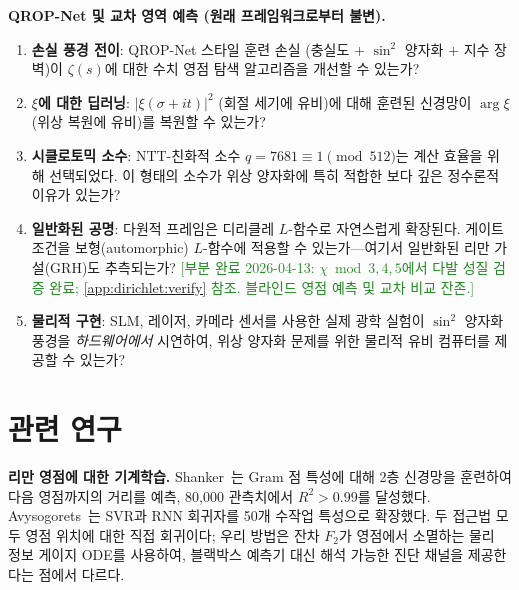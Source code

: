 \documentclass[11pt, a4paper]{article}
\theoremstyle{definition}
\theoremstyle{plain}
\newcommand{\xif}{\xi}
\begin{document}
\smallskip\noindent\textbf{QROP-Net 및 교차 영역 예측 (원래 프레임워크로부터 불변).}

\begin{enumerate}
  \item \textbf{손실 풍경 전이}: QROP-Net 스타일 훈련 손실 (충실도 + $\sin^2$ 양자화 + 지수 장벽)이 $\zeta(s)$에 대한 수치 영점 탐색 알고리즘을 개선할 수 있는가?

  \item \textbf{$\xif$에 대한 딥러닝}: $|\xif(\sigma+it)|^2$ (회절 세기에 유비)에 대해 훈련된 신경망이 $\arg\xif$ (위상 복원에 유비)를 복원할 수 있는가?

  \item \textbf{시클로토믹 소수}: NTT-친화적 소수 $q = 7681 \equiv 1 \pmod{512}$는 계산 효율을 위해 선택되었다. 이 형태의 소수가 위상 양자화에 특히 적합한 보다 깊은 정수론적 이유가 있는가?

  \item \textbf{일반화된 공명}: 다원적 프레임은 디리클레 $L$-함수로 자연스럽게 확장된다. 게이트 조건을 보형(automorphic) $L$-함수에 적용할 수 있는가---여기서 일반화된 리만 가설(GRH)도 추측되는가?
        \textcolor{ForestGreen}{[부분 완료 2026-04-13: $\chi\bmod 3,4,5$에서 다발 성질 검증 완료; \cref{app:dirichlet:verify} 참조. 블라인드 영점 예측 및 교차 비교 잔존.]}


  \item \textbf{물리적 구현}: SLM, 레이저, 카메라 센서를 사용한 실제 광학 실험이 $\sin^2$ 양자화 풍경을 \textit{하드웨어에서} 시연하여, 위상 양자화 문제를 위한 물리적 유비 컴퓨터를 제공할 수 있는가?
\end{enumerate}


\section{관련 연구}
\label{sec:related}

\noindent\textbf{리만 영점에 대한 기계학습.}
Shanker~\cite{Shanker2015NNZeta}는 Gram 점 특성에 대해 2층 신경망을 훈련하여
다음 영점까지의 거리를 예측, 80{,}000 관측치에서 $R^2>0.99$를 달성했다.
Avysogorets~\cite{Avysogorets2021RiemannZeta}는 SVR과 RNN 회귀자를 50개
수작업 특성으로 확장했다.
두 접근법 모두 영점 위치에 대한 직접 회귀이다; 우리 방법은 잔차 $F_2$가
영점에서 소멸하는 물리 정보 게이지 ODE를 사용하여, 블랙박스 예측기 대신
해석 가능한 진단 채널을 제공한다는 점에서 다르다.
\end{document}
